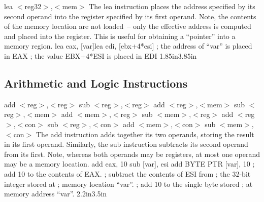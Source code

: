 {lea $<$reg32$>$,$<$mem$>$}
{The lea instruction places the address specified by its second
  operand into the register specified by its first operand. Note, the
  contents of the memory location are not loaded~-- only the effective
  address is computed and placed into the register.  This is useful
  for obtaining a ``pointer'' into a memory region.}
{lea eax, [var]\newline lea edi, [ebx+4*esi]}
{; the address of ``var'' is placed in EAX \newline
; the value EBX+4*ESI is placed in EDI}
{1.85in}{3.85in}

\subsection{Arithmetic and Logic Instructions}

{add $<$reg$>$,$<$reg$>$ \hspace{0.5in} sub $<$reg$>$,$<$reg$>$ \newline
add $<$reg$>$,$<$mem$>$ \hspace{0.5in} sub $<$reg$>$,$<$mem$>$ \newline
add $<$mem$>$,$<$reg$>$ \hspace{0.5in} sub $<$mem$>$,$<$reg$>$ \newline
add $<$reg$>$,$<$con$>$ \hspace{0.5in} sub $<$reg$>$,$<$con$>$ \newline
add $<$mem$>$,$<$con$>$ \hspace{0.5in} sub $<$mem$>$,$<$con$>$}
{The add instruction adds together its two operands, storing the
  result in its first operand. Similarly, the sub instruction
  subtracts its second operand from its first.  Note, whereas both
  operands may be registers, at most one operand may be a memory
  location.}
{add eax, 10\newline 
sub [var], esi\newline\newline\newline
add BYTE PTR [var], 10}
{; add 10 to the contents of EAX. \newline
; subtract the contents of ESI from \newline
; the 32-bit integer stored at \newline
; memory location ``var''.\newline
; add 10 to the single byte stored\newline
; at memory address ``var''.\newline}
{2.2in}{3.5in}

